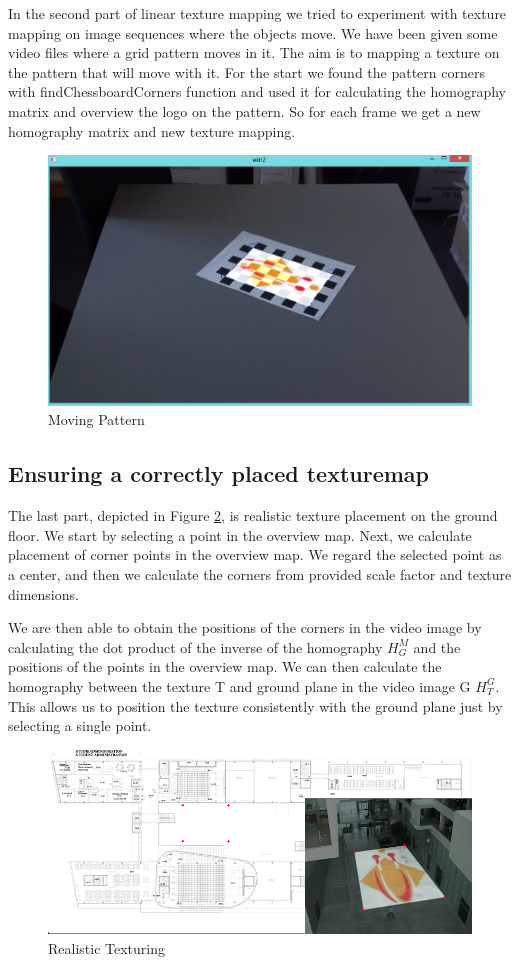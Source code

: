 In the second part of linear texture mapping we tried to experiment with texture mapping on image sequences where the objects move. We have been given some video files where a grid pattern moves in it. The aim is to mapping a texture on the pattern that will move with it. For the start we found the pattern corners with findChessboardCorners function and used it for calculating the homography matrix and overview the logo on the pattern. So for each frame we get a new homography matrix and new texture mapping.

\begin{figure}[h!]
	\centering
	\includegraphics[width=\textwidth]{Handin2/images/linearmapping2.jpg}
	\caption{Moving Pattern}
	\label{fig:movingpattern}
\end{figure}

\subsection{Ensuring a correctly placed texturemap}

The last part, depicted in Figure \ref{fig:realistictexturing}, is realistic texture placement on the ground floor. We start by selecting a point in the overview map. Next, we calculate placement of corner points in the overview map. We regard the selected point as a center, and then we calculate the corners from provided scale factor and texture dimensions.

We are then able to obtain the positions of the corners in the video image by calculating the dot product of the inverse of the homography $H_{G}^{M}$ and the positions of the points in the overview map. We can then calculate the homography between the texture T and ground plane in the video image G $H_{T}^{G}$. This allows us to position the texture consistently with the ground plane just by selecting a single point.

\begin{figure}[h!]
	\centering
	\includegraphics[width=\textwidth]{Handin2/images/realistictexturing.png}
	\caption{Realistic Texturing}
	\label{fig:realistictexturing}
\end{figure}

